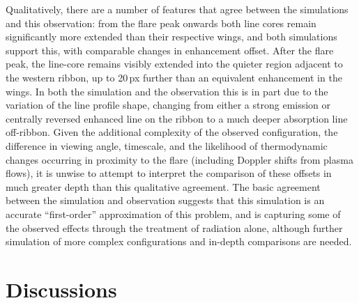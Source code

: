 Qualitatively, there are a number of features that agree between the simulations and this observation: from the flare peak onwards both line cores remain significantly more extended than their respective wings, and both simulations support this, with comparable changes in enhancement offset.
After the flare peak, the line-core remains visibly extended into the quieter region adjacent to the western ribbon, up to 20\,{}px further than an equivalent enhancement in the wings.
In both the simulation and the observation this is in part due to the variation of the line profile shape, changing from either a strong emission or centrally reversed enhanced line on the ribbon to a much deeper absorption line off-ribbon.
Given the additional complexity of the observed configuration, the difference in viewing angle, timescale, and the likelihood of thermodynamic changes occurring in proximity to the flare (including Doppler shifts from plasma flows), it is unwise to attempt to interpret the comparison of these offsets in much greater depth than this qualitative agreement.
The basic agreement between the simulation and observation suggests that this simulation is an accurate ``first-order'' approximation of this problem, and is capturing some of the observed effects through the treatment of radiation alone, although further simulation of more complex configurations and in-depth comparisons are needed.


\section{Discussions}

